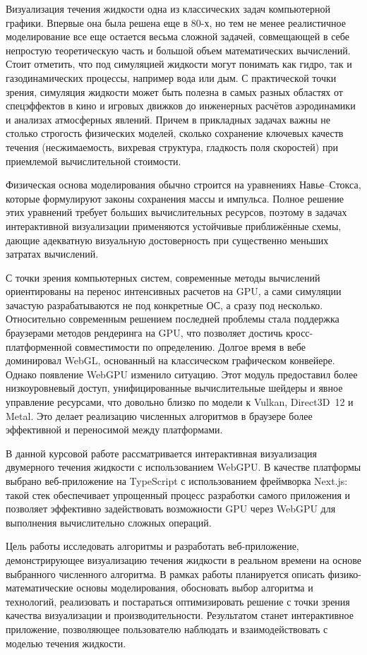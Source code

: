 Визуализация течения жидкости \textemdash{} одна из классических задач компьютерной графики. Впервые она была решена еще в 80-х, но тем не менее реалистичное моделирование все еще остается весьма сложной задачей, совмещающей в себе непростую теоретическую часть и большой объем математических вычислений. Стоит отметить, что под симуляцией жидкости могут понимать как гидро, так и газодинамических процессы, например вода или дым. С практической точки зрения, симуляция жидкости может быть полезна в самых разных областях \textemdash{} от спецэффектов в кино и игровых движков до инженерных расчётов аэродинамики и анализах атмосферных явлений. Причем в прикладных задачах важны не столько строгость физических моделей, сколько сохранение ключевых качеств течения (несжимаемость, вихревая структура, гладкость поля скоростей) при приемлемой вычислительной стоимости.

Физическая основа моделирования обычно строится на уравнениях Навье–Стокса, которые формулируют законы сохранения массы и импульса. Полное решение этих уравнений требует больших вычислительных ресурсов, поэтому в задачах интерактивной визуализации применяются устойчивые приближённые схемы, дающие адекватную визуальную достоверность при существенно меньших затратах вычислений.

С точки зрения компьютерных систем, современные методы вычислений ориентированы на перенос интенсивных расчетов на GPU, а сами симуляции зачастую разрабатываются не под конкретные ОС, а сразу под несколько. Относительно современным решением последней проблемы стала поддержка браузерами методов рендеринга на GPU, что позволяет достичь кросс-платформенной совместимости по определению. Долгое время в вебе доминировал WebGL, основанный на классическом графическом конвейере. Однако появление WebGPU изменило ситуацию. Этот модуль предоставил более низкоуровневый доступ, унифицированные вычислительные шейдеры и явное управление ресурсами, что довольно близко по модели к Vulkan, Direct3D~12 и Metal. Это делает реализацию численных алгоритмов в браузере более эффективной и переносимой между платформами.

В данной курсовой работе рассматривается интерактивная визуализация двумерного течения жидкости с использованием WebGPU. В качестве платформы выбрано веб-приложение на TypeScript с использованием фреймворка Next.js: такой стек обеспечивает упрощенный процесс разработки самого приложения и позволяет эффективно задействовать возможности GPU через WebGPU для выполнения вычислительно сложных операций.

Цель работы \textemdash{} исследовать алгоритмы и разработать веб-приложение, демонстрирующее визуализацию течения жидкости в реальном времени на основе выбранного численного алгоритма. В рамках работы планируется описать физико-математические основы моделирования, обосновать выбор алгоритма и технологий, реализовать и постараться оптимизировать решение с точки зрения качества визуализации и производительности. Результатом станет интерактивное приложение, позволяющее пользователю наблюдать и взаимодействовать с моделью течения жидкости.
